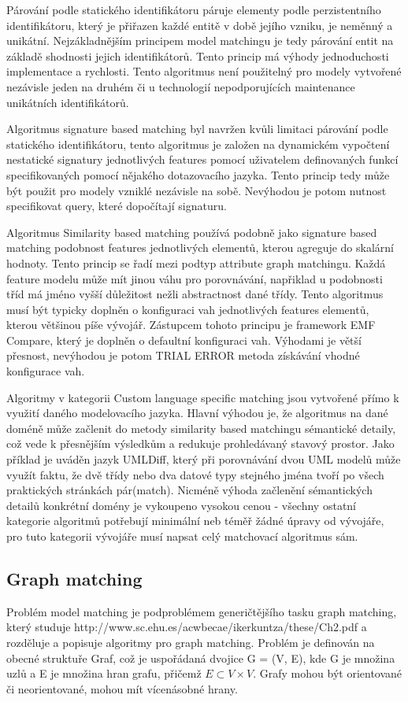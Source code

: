 \documentclass[11pt,twoside,a4paper]{book}
\begin{document}
 Párování podle statického identifikátoru páruje elementy podle perzistentního
 identifikátoru, který je přiřazen každé entitě v době jejího vzniku, je
 neměnný a unikátní. Nejzákladnějším principem model matchingu je tedy párování
 entit na základě shodnosti jejich identifikátorů. Tento princip má výhody
 jednoduchosti implementace a rychlosti. Tento algoritmus není použitelný pro
 modely vytvořené nezávisle jeden na druhém či u technologií nepodporujících
 maintenance unikátních identifikátorů.
 
 Algoritmus signature based matching byl navržen kvůli limitaci párování podle
 statického identifikátoru, tento algoritmus je založen na dynamickém vypočtení
 nestatické signatury jednotlivých features pomocí uživatelem definovaných
 funkcí specifikovaných pomocí nějakého dotazovacího jazyka. Tento princip tedy
 může být použit pro modely vzniklé nezávisle na sobě. Nevýhodou je potom
 nutnost specifikovat query, které dopočítají signaturu.
 
 Algoritmus Similarity based matching používá podobně jako signature based
 matching podobnost features jednotlivých elementů, kterou agreguje do skalární hodnoty.
 Tento princip se řadí mezi podtyp attribute graph matchingu. Každá feature
 modelu může mít jinou váhu pro porovnávání, napřiklad u podobnosti tříd má
 jméno vyšší důležitost nežli abstractnost dané třídy.  Tento algoritmus musí
 být typicky doplněn o konfiguraci vah jednotlivých features elementů, kterou
 většinou píše vývojář. Zástupcem tohoto principu je framework EMF Compare, 
 který je doplněn o defaultní konfiguraci vah. Výhodami je větší přesnost,
 nevýhodou je potom TRIAL ERROR metoda získávání vhodné konfigurace vah.
 
 Algoritmy v kategorii Custom language specific matching jsou vytvořené
 přímo k využití daného modelovacího jazyka. Hlavní výhodou je, že
 algoritmus na dané doméně může začlenit do metody similarity based matchingu
 sémantické detaily, což vede k přesnějším výsledkům a redukuje prohledávaný 
stavový prostor. Jako příklad je uváděn jazyk UMLDiff, který při porovnávání
dvou UML modelů může využít faktu, že dvě třídy nebo dva datové typy
stejného jména tvoří po všech praktických stránkách pár(match). Nicméně výhoda
začlenění sémantických detailů konkrétní domény je vykoupeno vysokou cenou -
všechny ostatní kategorie algoritmů potřebují minimální neb téměř žádné úpravy
od vývojáře, pro tuto kategorii vývojáře musí napsat celý matchovací algoritmus
sám.

\subsection{Graph matching}
 Problém model matching je podproblémem generičtějšího tasku graph matching,
 který studuje http://www.sc.ehu.es/acwbecae/ikerkuntza/these/Ch2.pdf a
 rozděluje a popisuje algoritmy pro graph matching. Problém je definován na
 obecné struktuře Graf, což je uspořádaná dvojice G = (V, E), kde G je množina
 uzlů a E je množina hran grafu, přičemž $E \subset V \times V$. Grafy mohou být
 orientované či neorientované, mohou mít vícenásobné hrany.
 
\end{document}
